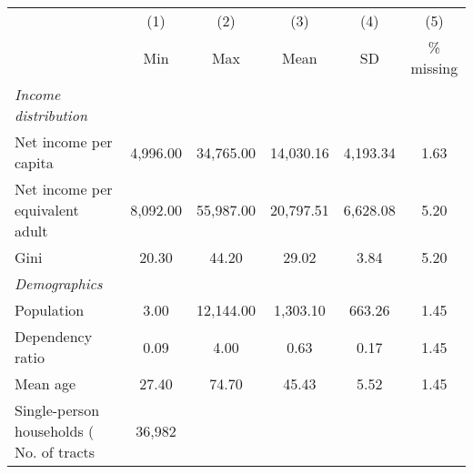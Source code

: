 
\begin{tabular}{@{}lccccc@{}}
\toprule
  & (1) & (2) & (3) &  (4) &  (5) \\
 & Min & Max & Mean & SD & \% missing\\
\midrule
\qquad \textit{Income distribution} \\
Net income per capita &  4,996.00 & 34,765.00 & 14,030.16 &  4,193.34 &      1.63\\
Net income per equivalent adult &  8,092.00 & 55,987.00 & 20,797.51 &  6,628.08 &      5.20\\
Gini &     20.30 &     44.20 &     29.02 &      3.84 &      5.20\\
\qquad \textit{Demographics} \\
Population &      3.00 & 12,144.00 &  1,303.10 &    663.26 &      1.45\\
Dependency ratio &      0.09 &      4.00 &      0.63 &      0.17 &      1.45\\
Mean age &     27.40 &     74.70 &     45.43 &      5.52 &      1.45\\
Single-person households (%
\midrule
No. of tracts &          36,982 \\
\midrule
\end{tabular}